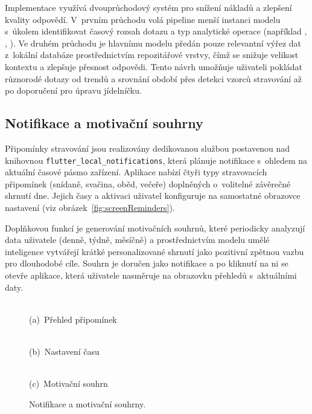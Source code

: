 Implementace využívá dvouprůchodový systém pro snížení nákladů a zlepšení kvality odpovědí.
V~prvním průchodu volá pipeline menší instanci modelu s~úkolem identifikovat časový rozsah dotazu a typ analytické operace (například , , ).
Ve druhém průchodu je hlavnímu modelu předán pouze relevantní výřez dat z~lokální databáze prostřednictvím repozitářové vrstvy, čímž se snižuje velikost kontextu a zlepšuje přesnost odpovědi.
Tento návrh umožňuje uživateli pokládat různorodé dotazy od trendů a srovnání období přes detekci vzorců stravování až po doporučení pro úpravu jídelníčku.

\subsection{Notifikace a motivační souhrny}
\label{subsec:notifikace}

Připomínky stravování jsou realizovány dedikovanou službou postavenou nad knihovnou \texttt{flutter\_local\_notifications}, která plánuje notifikace s~ohledem na aktuální časové pásmo zařízení.
Aplikace nabízí čtyři typy stravovacích připomínek (snídaně, svačina, oběd, večeře) doplněných o~volitelné závěrečné shrnutí dne.
Jejich časy a aktivaci uživatel konfiguruje na samostatné obrazovce nastavení (viz obrázek~\ref{fig:screenReminders}).

Doplňkovou funkcí je generování motivačních souhrnů, které periodicky analyzují data uživatele (denně, týdně, měsíčně) a prostřednictvím modelu umělé inteligence vytvářejí krátké personalizované shrnutí jako pozitivní zpětnou vazbu pro dlouhodobé cíle.
Souhrn je doručen jako notifikace a po kliknutí na ni se otevře aplikace, která uživatele nasměruje na obrazovku přehledů s~aktuálními daty.

\begin{figure}[!htb]
	\centering
	\begin{minipage}[t]{0.31\textwidth}
		\centering
		\\(a)~Přehled připomínek
	\end{minipage}\hfill
	\begin{minipage}[t]{0.31\textwidth}
		\centering
		\\(b)~Nastavení času
	\end{minipage}\hfill
	\begin{minipage}[t]{0.31\textwidth}
		\centering
		\\(c)~Motivační souhrn
	\end{minipage}
	\caption{Notifikace a motivační souhrny.}
	\label{fig:screenReminders}
	\label{fig:screenMotivationalSummary}
\end{figure}


